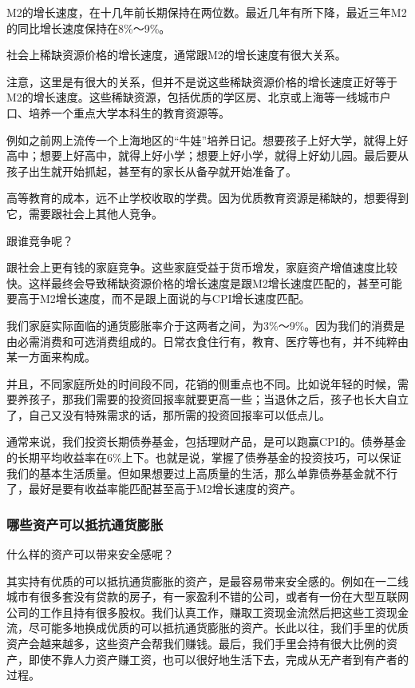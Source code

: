 M2的增长速度，在十几年前长期保持在两位数。最近几年有所下降，最近三年M2的同比增长速度保持在8\%～9\%。

社会上稀缺资源价格的增长速度，通常跟M2的增长速度有很大关系。

注意，这里是有很大的关系，但并不是说这些稀缺资源价格的增长速度正好等于M2的增长速度。这些稀缺资源，包括优质的学区房、北京或上海等一线城市户口、培养一个重点大学本科生的教育资源等。

例如之前网上流传一个上海地区的“牛娃”培养日记。想要孩子上好大学，就得上好高中；想要上好高中，就得上好小学；想要上好小学，就得上好幼儿园。最后要从孩子出生就开始抓起，甚至有的家长从备孕就开始准备了。

高等教育的成本，远不止学校收取的学费。因为优质教育资源是稀缺的，想要得到它，需要跟社会上其他人竞争。

跟谁竞争呢？

跟社会上更有钱的家庭竞争。这些家庭受益于货币增发，家庭资产增值速度比较快。这样最终会导致稀缺资源价格的增长速度是跟M2增长速度匹配的，甚至可能要高于M2增长速度，而不是跟上面说的与CPI增长速度匹配。

我们家庭实际面临的通货膨胀率介于这两者之间，为3\%～9\%。因为我们的消费是由必需消费和可选消费组成的。日常衣食住行有，教育、医疗等也有，并不纯粹由某一方面来构成。

并且，不同家庭所处的时间段不同，花销的侧重点也不同。比如说年轻的时候，需要养孩子，那我们需要的投资回报率就要更高一些；当退休之后，孩子也长大自立了，自己又没有特殊需求的话，那所需的投资回报率可以低点儿。

通常来说，我们投资长期债券基金，包括理财产品，是可以跑赢CPI的。债券基金的长期平均收益率在6\%上下。也就是说，掌握了债券基金的投资技巧，可以保证我们的基本生活质量。但如果想要过上高质量的生活，那么单靠债券基金就不行了，最好是要有收益率能匹配甚至高于M2增长速度的资产。

\subsubsection{哪些资产可以抵抗通货膨胀}

什么样的资产可以带来安全感呢？

其实持有优质的可以抵抗通货膨胀的资产，是最容易带来安全感的。例如在一二线城市有很多套没有贷款的房子，有一家盈利不错的公司，或者有一份在大型互联网公司的工作且持有很多股权。我们认真工作，赚取工资现金流然后把这些工资现金流，尽可能多地换成优质的可以抵抗通货膨胀的资产。长此以往，我们手里的优质资产会越来越多，这些资产会帮我们赚钱。最后，我们手里会持有很大比例的资产，即使不靠人力资产赚工资，也可以很好地生活下去，完成从无产者到有产者的过程。

